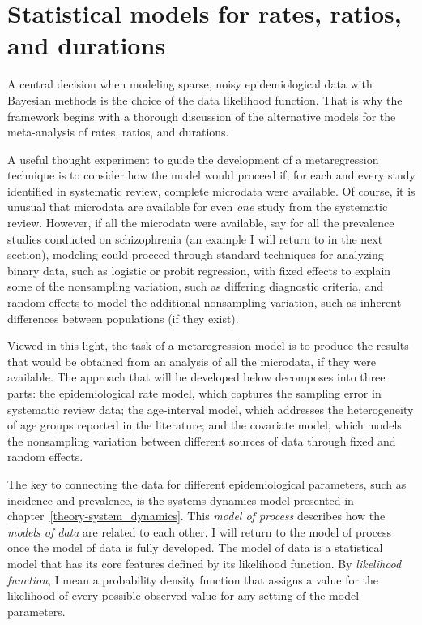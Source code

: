 \chapter[Statistical models for rates, ratios, and durations][Statistical models for rates]{Statistical models for rates, ratios, and durations}
\label{theory-rate_model}

A central decision when modeling sparse, noisy epidemiological data
with Bayesian methods is the choice of the data likelihood function.
That is why the framework begins with a thorough discussion of the
alternative models for the meta-analysis of rates, ratios, and
durations.

A useful thought experiment to guide the development of
a metaregression technique is to consider how the model would proceed
if, for each and every study identified in systematic review, complete
microdata were available.  Of course, it is unusual that microdata are
available for even \emph{one} study from the systematic review.  However,
if all the microdata were available, say for all the prevalence
studies conducted on schizophrenia (an example I will return to in
the next section), modeling could proceed through standard techniques
for analyzing binary data, such as logistic or probit regression, with
fixed effects to explain some of the nonsampling variation, such as
differing diagnostic criteria, and random effects to model the
additional nonsampling variation, such as inherent differences
between populations (if they exist).

Viewed in this light, the task of a metaregression model is to
produce the results that would be obtained from an analysis of all the
microdata, if they were available. The approach that will be
developed below decomposes into three parts: the epidemiological rate
model, which captures the sampling error in systematic review data;
the age-interval model, which addresses the heterogeneity of age groups
reported in the literature; and the covariate model, which
models the nonsampling variation between different sources of data
through fixed and random effects.

The key to connecting the data for different epidemiological
parameters, such as incidence and prevalence, is the systems dynamics
model presented in chapter~\ref{theory-system_dynamics}.  This \emph{model of
  process} describes how the \emph{models of data} are related to each
other.  I will return to the model of process once the model of data
is fully developed.  The model of data is a statistical model that
has its core features defined by its likelihood function.  By
\emph{likelihood function}, I mean a probability density function that
assigns a value for the likelihood of every possible observed value
for any setting of the model parameters.

